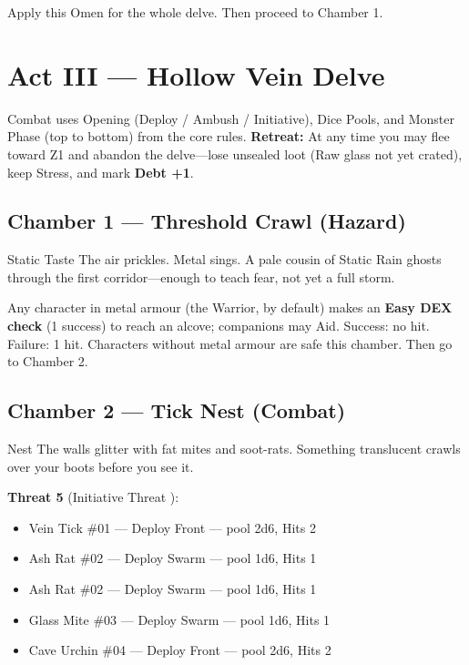 Apply this Omen for the whole delve. Then proceed to Chamber 1.

\section{Act III --- Hollow Vein Delve}

Combat uses Opening (Deploy / Ambush / Initiative), Dice Pools, and Monster Phase (top to bottom) from the core rules.
\textbf{Retreat:} At any time you may flee toward Z1 and abandon the delve---lose unsealed loot (Raw glass not yet crated), keep Stress, and mark \textbf{Debt +1}.

\subsection{Chamber 1 --- Threshold Crawl (Hazard)}

\begin{hazardbox}{Static Taste}
    The air prickles. Metal sings.
    A pale cousin of Static Rain ghosts through the first corridor---enough to teach fear, not yet a full storm.
\end{hazardbox}

Any character in metal armour (the Warrior, by default) makes an \textbf{Easy DEX check} (1 success) to reach an alcove; companions may Aid.
Success: no hit. Failure: 1 hit.
Characters without metal armour are safe this chamber.
Then go to Chamber 2.

\subsection{Chamber 2 --- Tick Nest (Combat)}

\begin{rpgbox}{Nest}
    The walls glitter with fat mites and soot-rats.
    Something translucent crawls over your boots before you see it.
\end{rpgbox}

\textbf{Threat 5} (Initiative Threat ):
\begin{itemize}
    \item Vein Tick \#01 --- Deploy Front --- pool 2d6, Hits 2
    \item Ash Rat \#02 --- Deploy Swarm --- pool 1d6, Hits 1
    \item Ash Rat \#02 --- Deploy Swarm --- pool 1d6, Hits 1
    \item Glass Mite \#03 --- Deploy Swarm --- pool 1d6, Hits 1
    \item Cave Urchin \#04 --- Deploy Front --- pool 2d6, Hits 2
\end{itemize}

